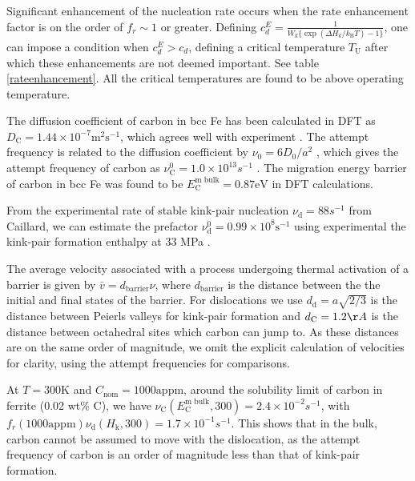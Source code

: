 \documentclass[a4paper,12pt,oneside,print,numbered,index,PageStyleIII]{PhDThesisPSnPDF}
\begin{document}
\begin{enumerate}
Significant enhancement of the nucleation rate occurs when the rate enhancement factor
is on the order of \(f_r \sim 1\) or greater. Defining \(c_d^E = \frac{1}{W_k \{\exp(
    \Delta H_{k}/k_{\text{B}}T ) - 1 \}}\), one can impose a condition when \(c_d^E > c_d\),
defining a critical temperature \(T_{\text{U}}\) after which these enhancements are not
deemed important. See table \ref{rateenhancement}. All the critical temperatures
are found to be above operating temperature.





The diffusion coefficient of carbon in bcc Fe has been calculated in DFT as
\(D_{\text{C}} = 1.44 \times10^{-7} \text{m}^2\text{s}^{-1}\), which agrees well with
experiment \cite{Jiang2003,daSilva1976}. The attempt frequency is related to the
diffusion coefficient by \(\nu_0 = 6D_0 / a^2\) \cite{Ramasubramaniam2008}, which gives
the attempt frequency of carbon as \(\nu_{\text{C}}^0 = 1.0 \times10^{13} s^{-1}\)
\cite{Nematollahi2016}. The migration energy barrier of carbon in bcc Fe was found to be
\(E^{\text{m bulk}}_{\text{C}} = 0.87 \text{eV}\) in DFT calculations.

From the experimental rate of stable kink-pair nucleation \(\nu_{\text{d}} = 88 s^{-1}\)
from Caillard, we can estimate the prefactor \(\nu_{\text{d}}^0 = 0.99 \times
    10^8\text{s}^{-1}\) using experimental the kink-pair formation enthalpy at 33 MPa
\cite{itakura13_effec_hydrog_atoms_screw_disloc}.

The average velocity associated with a process undergoing thermal activation of a
barrier is given by \(\bar{v} = d_{\text{barrier}}\nu\), where \(d_{\text{barrier}}\) is
the distance between the the initial and final states of the barrier. For dislocations
we use \(d_{\text{d}} = a\sqrt{2/3}\) is the distance between Peierls valleys for
kink-pair formation and \(d_{\text{C}} = 1.2\AA\) is the distance between octahedral
sites which carbon can jump to. As these distances are on the same order of magnitude,
we omit the explicit calculation of velocities for clarity, using the attempt frequencies for comparisons.

At \(T=300 \text{K}\) and \(C_{\text{nom}} = 1000 \text{appm}\), around the solubility
limit of carbon in ferrite (0.02 wt\% C), we have \(\nu_{\text{C}}(E^{\text{m
    bulk}}_{\text{C}},300) = 2.4\times 10^{-2} s^{-1}\), with \(f_r(1000
    \text{appm})\nu_{\text{d}}(H_{\text{k}},300) = 1.7 \times 10^{-1} s^{-1}\). This shows
that in the bulk, carbon cannot be assumed to move with the dislocation, as the
attempt frequency of carbon is an order of magnitude less than that of kink-pair
formation.


\end{enumerate}
\end{document}
